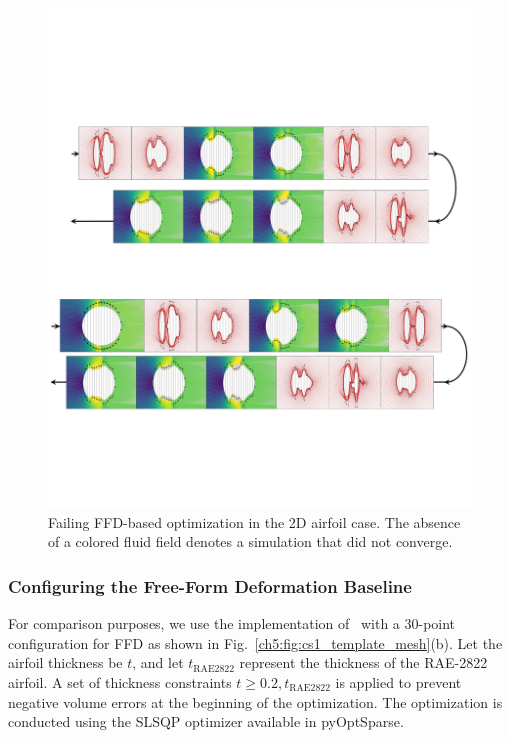 \begin{figure}[ht]
    \begin{center}
        \includegraphics[width=1\linewidth]{chapter5/fig/circle2airfoil_ffd_optim_field_visualization.pdf}
    \end{center}
     \vspace{-7mm}
    \caption{
        \small Failing FFD-based optimization in the 2D airfoil case. The absence of a colored fluid field denotes a simulation that did not converge.
    }
    \label{ch5:fig:cs1_ffd_cp}
\end{figure}

\subsubsection{Configuring the Free-Form Deformation Baseline}

For comparison purposes, we use the implementation of~\cite{aa.Li2021} with a 30-point configuration for FFD as shown in Fig.~\ref{ch5:fig:cs1_template_mesh}(b).
Let the airfoil thickness be $t$, and let $t_\text{RAE2822}$ represent the thickness of the RAE-2822 airfoil.
A set of thickness constraints $t \geq 0.2,t_\text{RAE2822}$ is applied to prevent negative volume errors at the beginning of the optimization. The optimization is conducted using the SLSQP optimizer available in pyOptSparse\cite{aa.Wu2020}.

